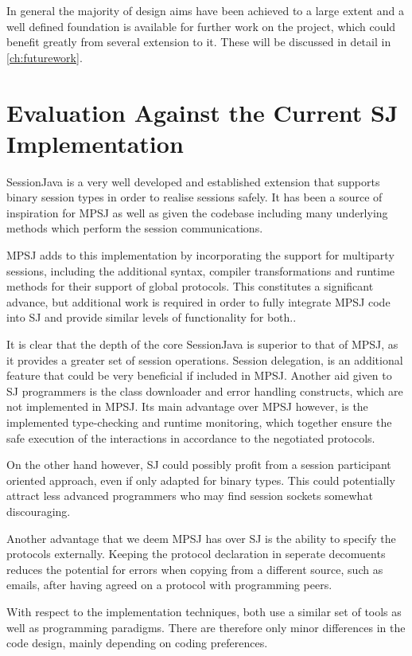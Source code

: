 In general the majority of design aims have been achieved to a large extent and a well defined foundation is available for further work on the project, which could benefit greatly from several extension to it. These will be discussed in detail in \autoref{ch:futurework}.


\section{Evaluation Against the Current SJ Implementation}

SessionJava is a very well developed and established extension that supports binary session types in order to realise sessions safely. It has been a source of inspiration for MPSJ as well as given the codebase including many underlying methods which perform the session communications.  

MPSJ adds to this implementation by incorporating the support for multiparty sessions, including the additional syntax, compiler transformations and runtime methods for their support of global protocols. This constitutes a significant advance, but additional work is required in order to fully integrate MPSJ code into SJ and provide similar levels of functionality for both..

It is clear that the depth of the core SessionJava is superior to that of MPSJ, as it provides a greater set of session operations. Session delegation, is an additional feature that could be very beneficial if included in MPSJ. Another aid given to SJ programmers is the class downloader and error handling constructs, which are not implemented in MPSJ. Its main advantage over MPSJ however, is the implemented type-checking and runtime monitoring, which together ensure the safe execution of the interactions in accordance to the negotiated protocols.

On the other hand however, SJ could possibly profit from a session participant oriented approach, even if only adapted for binary types. This could potentially attract less advanced programmers who may find session sockets somewhat discouraging.

Another advantage that we deem MPSJ has over SJ is the ability to specify the protocols externally. Keeping the protocol declaration in seperate decomuents reduces the potential for errors when copying from a different source, such as emails, after having agreed on a protocol with programming peers.

With respect to the implementation techniques, both use a similar set of tools as well as programming paradigms. There are therefore only minor differences in the code design, mainly depending on coding preferences. 

